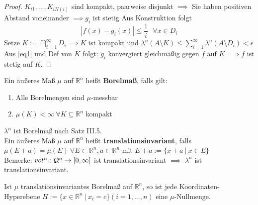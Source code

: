 \documentclass[11pt,a4paper,fleqn,openany]{report}
\begin{document}
\begin{proof}
		$K_{i1}, ...,K_{iN(i)}$ sind kompakt, paarweise disjunkt \newline 
		$\implies$ Sie haben positiven Abstand voneinander \newline
		$\implies g_i$ ist stetig \newline
		Aus Konstruktion folgt \begin{equation}
		 |f(x) - g_i(x)| \leq \frac{1}{i} \text{ } \forall x\in D_i
		 \label{eq1}
		\end{equation}
		Setze $K:= \bigcap\limits_{i=1}^{\infty} D_i \implies K$ ist kompakt und $\lambda^n(A\setminus K) \leq \sum\limits_{i=1}^{\infty}\lambda^n(A\setminus D_i) < \epsilon$ \newline
		Aus \ref{eq1} und Def von $K$ folgt: $g_i$ konvergiert gleichmäßig gegen $f$ auf $K$ $\implies f$ ist stetig auf $K$. 
	\end{proof}

\newpage

    \begin{definition}
      Ein äußeres Maß $\mu$ auf $\mathbb{R}^n$ heißt \textbf{Borelmaß}, falls gilt:
      \begin{enumerate}
        \item Alle Borelmengen sind $\mu$-messbar
        \item $\mu(K)<\infty \ \forall K \subseteq \mathbb{R}^n$ kompakt
      \end{enumerate}
    \end{definition}

    \begin{remark}
      $\lambda^n$ ist Borelmaß nach Satz III.5.\\
      Ein äußeres Maß $\mu$ auf $\mathbb{R}^n$ heißt \textbf{translationsinvariant}, falls \\
      $\mu(E + a) = \mu(E) \ \forall E \subset \mathbb{R}^n, a \in \mathbb{R}^n$ mit $E + a := \{x + a \ | \ x \in E\}$\\
      Bemerke: $vol^n:\mathcal{Q}^n \to [0, \infty]$ ist translationsinvariant $\implies$ $\lambda^n$ ist translationsinvariant.
    \end{remark}

    \begin{lemma}
      Ist $\mu$ translationsinvariantes Borelmaß auf $\mathbb{R}^n$, so ist jede Koordinaten-Hyperebene $H := \{x \in \mathbb{R}^n \ | \ x_i = c\} (i=1,...,n)$ eine $\mu$-Nullmenge.
    \end{lemma}
\end{document}
